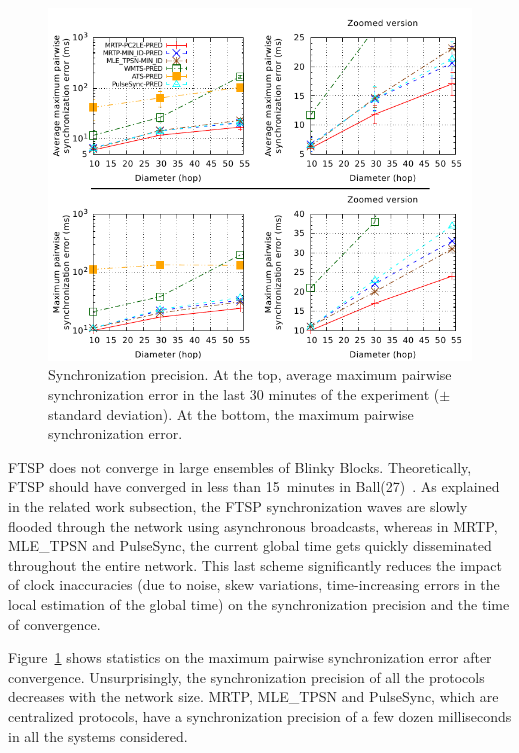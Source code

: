 \begin{figure}[h!]
	\centering
	\includegraphics[width=1\linewidth]{images/time-synchronization/precision}
	\caption{Synchronization precision. At the top, average maximum pairwise synchronization error in the last 30 minutes of the experiment ($\pm$ standard deviation). At the bottom, the maximum pairwise synchronization error.}
	\label{fig:time-sync:precision}
\end{figure}

FTSP does not converge in large ensembles of Blinky Blocks. Theoretically, FTSP should have converged in less than 15~minutes in Ball(27)~\cite{maroti2004flooding}. As explained in the related work subsection, the FTSP synchronization waves are slowly flooded through the network using asynchronous broadcasts, whereas in  MRTP, MLE\_TPSN and PulseSync, the current global time gets quickly disseminated throughout the entire network. This last scheme significantly reduces the impact of clock inaccuracies (due to noise, skew variations, time-increasing errors in the local estimation of the global time) on the synchronization precision and the time of convergence.

Figure~\ref{fig:time-sync:precision} shows statistics on the maximum pairwise synchronization error after convergence. Unsurprisingly, the synchronization precision of all the protocols decreases with the network size. MRTP, MLE\_TPSN and PulseSync, which are centralized protocols, have a synchronization precision of a few dozen milliseconds in all the systems considered.

